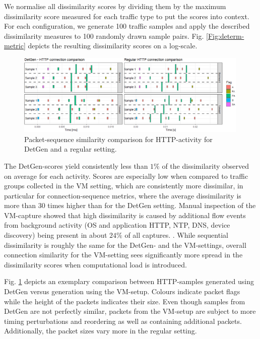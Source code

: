 \documentclass[runningheads]{llncs}
\begin{document}
We normalise all dissimilarity scores by dividing them by the maximum dissimilarity score measured for each traffic type to put the scores into context.
For each configuration, we generate 100 traffic samples and apply the described dissimilarity measures to 100 randomly drawn sample pairs. Fig. \ref{Fig:determ-metric} depicts the resulting dissimilarity scores on a log-scale.

\begin{figure}
\centering
\includegraphics[width=0.99\textwidth]{images/Detgen_Reg_HTTP_comp_crop.png}
\caption{Packet-sequence similarity comparison for HTTP-activity for DetGen and a regular setting.}\label{Fig:HTTP-seq}
\end{figure}

The DetGen-scores yield consistently less than $1\%$ of the dissimilarity observed on average for each activity. Scores are especially low when compared to traffic groups collected in the VM setting, which are consistently more dissimilar, in particular for connection-sequence metrics, where the average dissimilarity is more than 30 times higher than for the DetGen setting. Manual inspection of the VM-capture showed that high dissimilarity is caused by additional flow events from background activity (OS and application HTTP, NTP, DNS, device discovery) being present in about $24\%$ of all captures.
. While sequential dissimilarity is roughly the same for the DetGen- and the VM-settings, overall connection similarity for the VM-setting sees significantly more spread in the dissimilarity scores when computational load is introduced.

Fig. \ref{Fig:HTTP-seq} depicts an exemplary comparison between HTTP-samples generated using DetGen versus generation using the VM-setup. Colours indicate packet flags while the height of the packets indicates their size. Even though samples from DetGen are not perfectly similar, packets from the VM-setup are subject to more timing perturbations and reordering as well as containing additional packets. Additionally, the packet sizes vary more in the regular setting.
\end{document}
